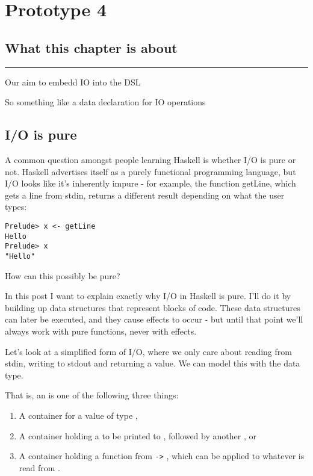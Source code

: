 \documentclass[thesis-solanki.tex]{subfiles}
\begin{document}
\chapter{Prototype 4}{\label{proto4}}


\section{What this chapter is about}

\noindent\rule{\textwidth}{0.5pt}

Our aim to embedd IO into the DSL

So something like a data declaration for IO operations

\section{I/O is pure}

\cite{website:ioispurechristaylor}

A common question amongst people learning Haskell is whether I/O is pure or not. Haskell advertises itself as a purely functional 
programming language, but I/O looks like it's inherently impure - for example, the function getLine, which gets a line from stdin, returns 
a different result depending on what the user types:

\begin{verbatim}
Prelude> x <- getLine
Hello
Prelude> x
"Hello"
\end{verbatim}

How can this possibly be pure?

In this post I want to explain exactly why I/O in Haskell is pure. I'll do it by building up data structures that represent blocks of code. 
These data structures can later be executed, and they cause effects to occur - but until that point we'll always work with pure functions, 
never with effects.

Let's look at a simplified form of I/O, where we only care about reading from stdin, writing to stdout and returning a value. We can model 
this with the  data type.

That is, an  is one of the following three things:
\begin{enumerate}
\item A container for a value of type ,

\item A container holding a  to be printed to ,
  followed by another , or

\item A container holding a function from  \Verb!->! , which can be applied
  to whatever  is read from . 
\end{enumerate}
\end{document}
